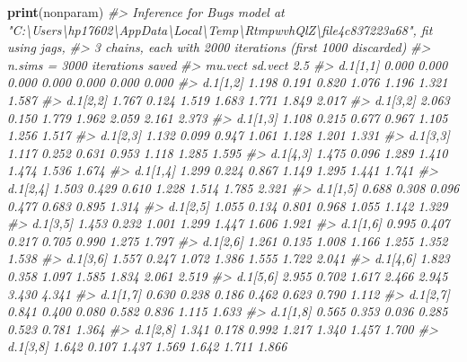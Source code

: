 \documentclass[]{article}
\newenvironment{Shaded}{\begin{snugshade}}{\end{snugshade}}
\newcommand{\CommentTok}[1]{\textcolor[rgb]{0.56,0.35,0.01}{\textit{#1}}}
\newcommand{\KeywordTok}[1]{\textcolor[rgb]{0.13,0.29,0.53}{\textbf{#1}}}
\newcommand{\NormalTok}[1]{#1}
\begin{document}
\begin{Shaded}
\begin{Highlighting}[]
\KeywordTok{print}\NormalTok{(nonparam)}
\CommentTok{#> Inference for Bugs model at "C:\textbackslash{}Users\textbackslash{}hp17602\textbackslash{}AppData\textbackslash{}Local\textbackslash{}Temp\textbackslash{}RtmpwvhQlZ\textbackslash{}file4c837223a68", fit using jags,}
\CommentTok{#>  3 chains, each with 2000 iterations (first 1000 discarded)}
\CommentTok{#>  n.sims = 3000 iterations saved}
\CommentTok{#>            mu.vect sd.vect     2.5%
\CommentTok{#> d.1[1,1]     0.000   0.000    0.000    0.000    0.000    0.000    0.000}
\CommentTok{#> d.1[1,2]     1.198   0.191    0.820    1.076    1.196    1.321    1.587}
\CommentTok{#> d.1[2,2]     1.767   0.124    1.519    1.683    1.771    1.849    2.017}
\CommentTok{#> d.1[3,2]     2.063   0.150    1.779    1.962    2.059    2.161    2.373}
\CommentTok{#> d.1[1,3]     1.108   0.215    0.677    0.967    1.105    1.256    1.517}
\CommentTok{#> d.1[2,3]     1.132   0.099    0.947    1.061    1.128    1.201    1.331}
\CommentTok{#> d.1[3,3]     1.117   0.252    0.631    0.953    1.118    1.285    1.595}
\CommentTok{#> d.1[4,3]     1.475   0.096    1.289    1.410    1.474    1.536    1.674}
\CommentTok{#> d.1[1,4]     1.299   0.224    0.867    1.149    1.295    1.441    1.741}
\CommentTok{#> d.1[2,4]     1.503   0.429    0.610    1.228    1.514    1.785    2.321}
\CommentTok{#> d.1[1,5]     0.688   0.308    0.096    0.477    0.683    0.895    1.314}
\CommentTok{#> d.1[2,5]     1.055   0.134    0.801    0.968    1.055    1.142    1.329}
\CommentTok{#> d.1[3,5]     1.453   0.232    1.001    1.299    1.447    1.606    1.921}
\CommentTok{#> d.1[1,6]     0.995   0.407    0.217    0.705    0.990    1.275    1.797}
\CommentTok{#> d.1[2,6]     1.261   0.135    1.008    1.166    1.255    1.352    1.538}
\CommentTok{#> d.1[3,6]     1.557   0.247    1.072    1.386    1.555    1.722    2.041}
\CommentTok{#> d.1[4,6]     1.823   0.358    1.097    1.585    1.834    2.061    2.519}
\CommentTok{#> d.1[5,6]     2.955   0.702    1.617    2.466    2.945    3.430    4.341}
\CommentTok{#> d.1[1,7]     0.630   0.238    0.186    0.462    0.623    0.790    1.112}
\CommentTok{#> d.1[2,7]     0.841   0.400    0.080    0.582    0.836    1.115    1.633}
\CommentTok{#> d.1[1,8]     0.565   0.353    0.036    0.285    0.523    0.781    1.364}
\CommentTok{#> d.1[2,8]     1.341   0.178    0.992    1.217    1.340    1.457    1.700}
\CommentTok{#> d.1[3,8]     1.642   0.107    1.437    1.569    1.642    1.711    1.866}
}
\end{Highlighting}
\end{Shaded}
\end{document}
